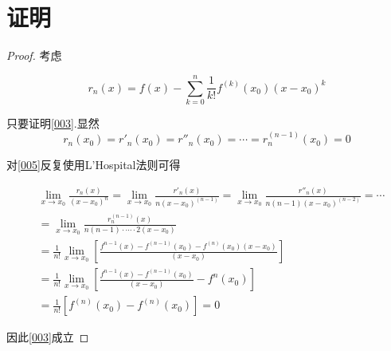 \documentclass{ctexart}
\begin{document}
\section{证明}
\begin{proof}
考虑

\begin{equation}
  r_n(x)=f(x)-\sum\limits_{k=0}^n\frac{1}{k!}f^{(k)}(x_0)(x-x_0)^k\label{005}
\end{equation}

只要证明\eqref{003}.显然
\begin{equation}
  r_n(x_0)=r'_n(x_0)=r''_n(x_0)=\cdots=r_n^{(n-1)}(x_0)=0\label{006}
\end{equation}

对\eqref{005}反复使用L'Hospital法则可得

\begin{equation}
  \begin{split}
    &\lim_{x\rightarrow x_0}\frac{r_n(x)}{(x-x_0)^n}=\lim_{x\rightarrow x_0}\frac{r'_n(x)}{n(x-x_0)^{(n-1)}}=\lim_{x\rightarrow x_0}\frac{r''_n(x)}{n(n-1)(x-x_0)^{(n-2)}}=\cdots \\
    &=\lim_{x\rightarrow x_0}\frac{r_n^{(n-1)}(x)}{n(n-1)\cdot\cdots\cdot2(x-x_0)}\\
    &=\frac{1}{n!}\lim_{x\rightarrow x_0}[\frac{f^{n-1}(x)-f^{(n-1)}(x_0)-f^{(n)}(x_0)(x-x_0)}{(x-x_0)}] \\
    &=\frac{1}{n!}\lim_{x\rightarrow x_0}[\frac{f^{n-1}(x)-f^{(n-1)}(x_0)}{(x-x_0)}-f^{n}(x_0)]\\
    &=\frac{1}{n!}[f^{(n)}(x_0)-f^{(n)}(x_0)]=0
  \end{split}
\end{equation}

因此\eqref{003}成立
\end{proof}
\end{document}
